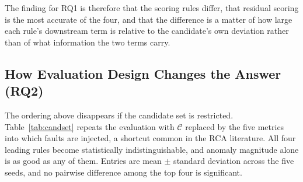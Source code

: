 \documentclass[conference]{IEEEtran}
\begin{document}
The finding for RQ1 is therefore that the scoring rules differ, that residual scoring is the most accurate of the four, and that the difference is a matter of how large each rule's downstream term is relative to the candidate's own deviation rather than of what information the two terms carry.

\begin{table}[htbp]
\centering
\caption{Pre-registered partitions, corrected counterfactual restoration against residual scoring, 860 incidents.}
\label{tab:regime}
\end{table}

\subsection{How Evaluation Design Changes the Answer (RQ2)}
\label{sec:results-candset}
The ordering above disappears if the candidate set is restricted. Table~\ref{tab:candset} repeats the evaluation with $\mathcal{C}$ replaced by the five metrics into which faults are injected, a shortcut common in the RCA literature. All four leading rules become statistically indistinguishable, and anomaly magnitude alone is as good as any of them. Entries are mean $\pm$ standard deviation across the five seeds, and no pairwise difference among the top four is significant.
\end{document}

